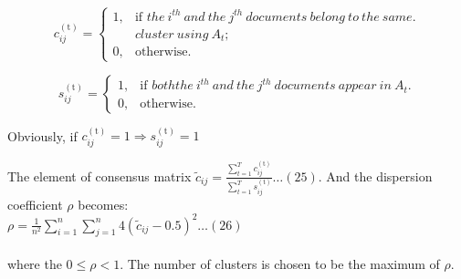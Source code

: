 \documentclass[11pt, oneside]{article}   	%
\begin{document}
\begin{Large}
\begin{equation}\tag{23}
  c^{\mathrm{(t)}}_{ij} =\begin{cases}
    1, & \text{if $the\ i^{th}\ and \ the \ j^{th} \ documents\ belong\ to \ the \ same$}.\\
    &cluster\ using \ A_t;\\
    0, & \text{otherwise}.
  \end{cases}
\end{equation}

\begin{equation}\tag{24}
  s^{\mathrm{(t)}}_{ij} =\begin{cases}
    1, & \text{if $both the\ i^{th}\ and \ the \ j^{th} \ documents\ appear \ in \ A_t$}.\\
    0, & \text{otherwise}.
  \end{cases}
\end{equation}

Obviously, if $c^{\mathrm{(t)}}_{ij} =1 \Rightarrow s^{\mathrm{(t)}}_{ij} =1$

The element of consensus matrix $\tilde{c}_{ij}=\frac{\sum_{t=1}^T c^{\mathrm{(t)}}_{ij} }{\sum_{t=1}^T s^{\mathrm{(t)}}_{ij} }\ldots(25)$.  And the dispersion coefficient $\rho$ becomes: \\

\hspace{120pt} $\rho=\frac{1}{n^2}\sum_{i=1}^n\sum_{j=1}^n4(\tilde{c}_{ij}-0.5)^2\ldots(26)$\\
\\where the $0\leq\rho<1$.  The number of clusters is chosen to be the maximum of $\rho$.


\end{Large}
\end{document}
